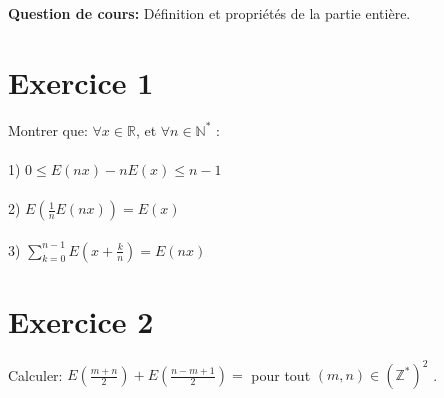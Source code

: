 \documentclass{article}
\begin{document}
\maketitle


\textbf{Question de cours:}
D\'efinition et propri\'et\'es de la partie enti\`ere.


\section{Exercice 1 }
Montrer que: $\forall x\in \mathbb{R}$, et $\forall n \in \mathbb{N}^*$ :
\\
\\1)  $0\leq E(nx)-nE(x)\leq n-1 $
\\
\\2) $E( \frac{1}{n}E(nx))=E(x)$
\\
\\3) $\sum_{k=0}^{n-1} E(x+\frac{k}{n})=E(nx) $


\section{Exercice 2 }
Calculer: $E(\frac{m+n}{2})+E(\frac{n-m+1}{2})=$ pour tout $(m,n)\in (\mathbb{Z}^*)^2$ .
\\ 





\end{document}
